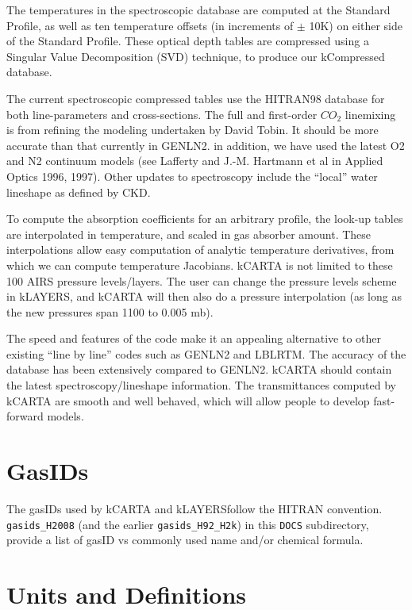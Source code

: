 \documentclass[11pt]{article}
\newcommand{\kc}{kCARTA }
\newcommand{\kl}{kLAYERS}
\begin{document}
The temperatures in the spectroscopic database are computed at the Standard 
Profile, as well as ten temperature offsets (in increments of $\pm$ 10K) on 
either side of the Standard Profile. These optical depth tables are compressed
using a Singular Value Decomposition ({\sf SVD}) technique, to produce our 
{\sf kCompressed} database.  

The current spectroscopic compressed
tables use the {\sf HITRAN98} database for both line-parameters and
cross-sections.  The full and first-order $CO_{2}$ linemixing is from 
refining the modeling undertaken by David Tobin. It should be more accurate 
than that currently in {\sf GENLN2}. in addition, we have used the latest
O2 and N2 continuum models (see Lafferty and J.-M. Hartmann et al in Applied 
Optics 1996, 1997). Other updates to spectroscopy include the ``local'' 
water lineshape as defined by CKD.

To compute the absorption coefficients for an arbitrary profile, the look-up 
tables are interpolated in temperature, and scaled in gas absorber amount.  
These interpolations allow easy computation of analytic temperature 
derivatives, from which we can compute temperature Jacobians. \kc is not 
limited to these 100 AIRS pressure levels/layers. The user can change the 
pressure levels scheme in \kl, and \kc will then also do a pressure 
interpolation (as long as the new pressures span 1100 to 0.005 mb). 

The speed and features of the code make it an appealing alternative to other
existing ``line by line'' codes such as {\sf GENLN2} and {\sf LBLRTM}.
The accuracy of the database has been extensively compared to {\sf
  GENLN2}.  \kc should contain the latest spectroscopy/lineshape information. 
The transmittances computed by \kc are smooth and well behaved, which 
will allow people to develop fast-forward models.

\section{GasIDs}
The gasIDs used by \kc and \kl follow the HITRAN
convention. \texttt{gasids\_H2008} (and the earlier
\texttt{gasids\_H92\_H2k}) in this \texttt{DOCS} subdirectory, provide
a list of gasID vs commonly used name and/or chemical formula.

\section{Units and Definitions}
\end{document}
